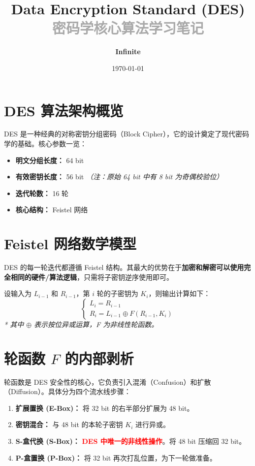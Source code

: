 \documentclass[12pt,a4paper]{article}
\title{
    \vspace{-2cm}
    \color{macblue}\Huge\textbf{Data Encryption Standard (DES)}\\
    \vspace{0.5cm}
    \Large\textcolor{darkgray}{密码学核心算法学习笔记}
    \vspace{0.5cm}
}
\author{\textbf{Infinite}}
\date{\today}
\begin{document}
\maketitle
\thispagestyle{fancy} %

\section{DES 算法架构概览}
DES 是一种经典的对称密钥分组密码（Block Cipher），它的设计奠定了现代密码学的基础。核心参数一览：
\begin{itemize}[itemsep=4pt, parsep=0pt]
    \item \textbf{明文分组长度：} 64 bit
    \item \textbf{有效密钥长度：} 56 bit \textit{（注：原始 64 bit 中有 8 bit 为奇偶校验位）}
    \item \textbf{迭代轮数：} 16 轮
    \item \textbf{核心结构：} Feistel 网络
\end{itemize}

\section{Feistel 网络数学模型}
DES 的每一轮迭代都遵循 Feistel 结构。其最大的优势在于\textbf{加密和解密可以使用完全相同的硬件/算法逻辑}，只需将子密钥逆序使用即可。

\begin{coreconcept}[第 $i$ 轮迭代公式]
设输入为 $L_{i-1}$ 和 $R_{i-1}$，第 $i$ 轮的子密钥为 $K_i$，则输出计算如下：
\begin{equation}
\begin{cases}
    L_i = R_{i-1} \\
    R_i = L_{i-1} \oplus F(R_{i-1}, K_i)
\end{cases}
\end{equation}
\textit{* 其中 $\oplus$ 表示按位异或运算，F 为非线性轮函数。}
\end{coreconcept}

\section{轮函数 $F$ 的内部剥析}
轮函数是 DES 安全性的核心，它负责引入混淆（Confusion）和扩散（Diffusion）。具体分为四个流水线步骤：
\begin{enumerate}[label=\textbf{Step \arabic*.}, itemsep=5pt]
    \item \textbf{扩展置换 (E-Box)：} 将 32 bit 的右半部分扩展为 48 bit。
    \item \textbf{密钥混合：} 与 48 bit 的本轮子密钥 $K_i$ 进行异或。
    \item \textbf{S-盒代换 (S-Box)：} \textcolor{red}{\textbf{DES 中唯一的非线性操作}}。将 48 bit 压缩回 32 bit。
    \item \textbf{P-盒置换 (P-Box)：} 将 32 bit 再次打乱位置，为下一轮做准备。
\end{enumerate}
\end{document}
